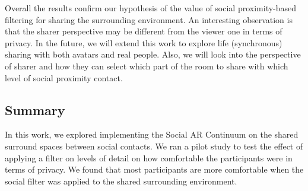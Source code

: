 Overall the results confirm our hypothesis of the value of social proximity-based filtering for sharing the surrounding environment. An interesting observation is that the sharer perspective may be different from the viewer one in terms of privacy. In the future, we will extend this work to explore life (synchronous) sharing with both avatars and real people. Also, we will look into the perspective of sharer and how they can select which part of the room to share with which level of social proximity contact.

\subsection{Summary}

In this work, we explored implementing the Social AR Continuum on the shared surround spaces between social contacts. We ran a pilot study to test the effect of applying a filter on levels of detail on how comfortable the participants were in terms of privacy. We found that most participants are more comfortable when the social filter was applied to the shared surrounding environment. 